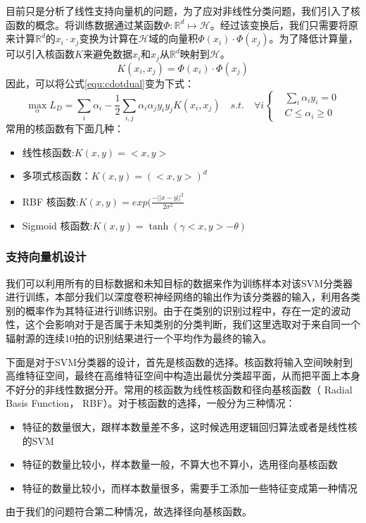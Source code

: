目前只是分析了线性支持向量机的问题，为了应对非线性分类问题，我们引入了核函数的概念。将训练数据通过某函数$\Phi:\mathbb{R}^d\mapsto\mathcal{H}$。经过该变换后，我们只需要将原来计算$\mathbb{R}^d$的$x_i\cdot x_j$变换为计算在$\mathcal{H}$域的向量积$\Phi(x_i)\cdot\Phi(x_j)$。为了降低计算量，可以引入核函数$K$来避免数据$x_i$和$x_j$从$\mathbb{R}^d$映射到$\mathcal{H}$。
\begin{equation}
	K(x_i,x_j)=\Phi(x_i)\cdot\Phi(x_j)
\end{equation}
因此，可以将公式\ref{equ:cdotdual}变为下式：
\begin{equation}
	\max \limits_{\alpha} L_D=\sum_i{\alpha_i}-\frac{1}{2}\sum_{i,j}\alpha_i\alpha_jy_iy_j K(x_i,x_j)\quad s.t. \quad \forall i
	\left\{
		\begin{aligned}
	   &\sum_i{\alpha_iy_i}=0  \\
	   &C \leq \alpha_i \geq 0
	   \end{aligned}
		\right.
\end{equation}
常用的核函数有下面几种：
\begin{itemize}
	\item 线性核函数:$K(x,y)=<x,y>$
	\item 多项式核函数：$K(x,y)=(<x,y>)^d$
	\item RBF 核函数:$K(x,y)=exp(\frac{-||x-y||^2}{2\sigma^2}$
	\item Sigmoid 核函数:$K(x,y)=\tanh(\gamma<x,y>-\theta)$
\end{itemize}
\subsubsection{支持向量机设计}
我们可以利用所有的目标数据和未知目标的数据来作为训练样本对该SVM分类器进行训练，本部分我们以深度卷积神经网络的输出作为该分类器的输入，利用各类别的概率作为其特征进行训练识别。由于在类别的识别过程中，存在一定的波动性，这个会影响对于是否属于未知类别的分类判断，我们这里选取对于来自同一个辐射源的连续10拍的识别结果进行一个平均作为最终的输入。

下面是对于SVM分类器的设计，首先是核函数的选择。核函数将输入空间映射到高维特征空间，最终在高维特征空间中构造出最优分类超平面，从而把平面上本身不好分的非线性数据分开。常用的核函数为线性核函数和径向基核函数（ Radial Basis Function， RBF）。对于核函数的选择，一般分为三种情况：
\begin{itemize}
	\item  特征的数量很大，跟样本数量差不多，这时候选用逻辑回归算法或者是线性核的SVM
	\item  特征的数量比较小，样本数量一般，不算大也不算小，选用径向基核函数
	\item  特征的数量比较小，而样本数量很多，需要手工添加一些特征变成第一种情况
\end{itemize}
由于我们的问题符合第二种情况，故选择径向基核函数。

